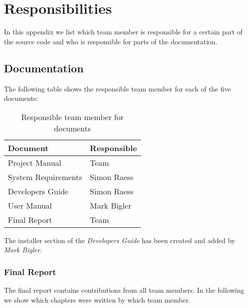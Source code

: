 \chapter{Responsibilities}
\label{chapter:responsibilities}

In this appendix we list which team member is responsible for a certain part
of the source code and who is responsible for parts of the documentation.



\section{Documentation}
The following table shows the responsible team member for each of the
five documents:
\begin{table}[H]
 \centering
 \begin{tabular}{|l|l|}
  \hline
   \multicolumn{1}{|p{2.0in}|}{\bfseries{\textsf{Document}}} &
   \multicolumn{1}{|p{1.0in}|}{\bfseries{\textsf{Responsible}}} \\
  \hline
   \multicolumn{1}{|p{2.0in}|}{Project Manual} &
   \multicolumn{1}{|p{1.0in}|}{Team} \\
  \hline
   \multicolumn{1}{|p{2.0in}|}{System Requirements} &
   \multicolumn{1}{|p{1.0in}|}{Simon Raess} \\
  \hline
   \multicolumn{1}{|p{2.0in}|}{Developers Guide} &
   \multicolumn{1}{|p{1.0in}|}{Simon Raess} \\
  \hline
   \multicolumn{1}{|p{2.0in}|}{User Manual} &
   \multicolumn{1}{|p{1.0in}|}{Mark Bigler} \\
  \hline
   \multicolumn{1}{|p{2.0in}|}{Final Report} &
   \multicolumn{1}{|p{1.0in}|}{Team} \\
  \hline
 \end{tabular}
 \caption{Responsible team member for documents}
\end{table}
The installer section of the \emph{Developers Guide} has been created and added by \emph{Mark Bigler}.


\subsection{Final Report}
The final report contains contributions from all team members. In the following
we show which chapters were written by which team member.

